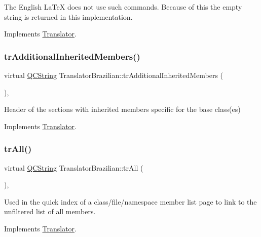 The English La\+TeX does not use such commands. Because of this the empty string is returned in this implementation. 

Implements \mbox{\hyperlink{class_translator}{Translator}}.

\mbox{\label{class_translator_brazilian_a6a7579d722b785447709b80a279ff563}} 
\subsubsection{\texorpdfstring{trAdditionalInheritedMembers()}{trAdditionalInheritedMembers()}}
{\footnotesize\ttfamily virtual \mbox{\hyperlink{class_q_c_string}{Q\+C\+String}} Translator\+Brazilian\+::tr\+Additional\+Inherited\+Members (\begin{DoxyParamCaption}{ }\end{DoxyParamCaption})\hspace{0.3cm}{\ttfamily [inline]}, {\ttfamily [virtual]}}

Header of the sections with inherited members specific for the base class(es) 

Implements \mbox{\hyperlink{class_translator}{Translator}}.

\mbox{\label{class_translator_brazilian_a75130e665f51c3415063a236ca156d34}} 
\subsubsection{\texorpdfstring{trAll()}{trAll()}}
{\footnotesize\ttfamily virtual \mbox{\hyperlink{class_q_c_string}{Q\+C\+String}} Translator\+Brazilian\+::tr\+All (\begin{DoxyParamCaption}{ }\end{DoxyParamCaption})\hspace{0.3cm}{\ttfamily [inline]}, {\ttfamily [virtual]}}

Used in the quick index of a class/file/namespace member list page to link to the unfiltered list of all members. 

Implements \mbox{\hyperlink{class_translator}{Translator}}.

